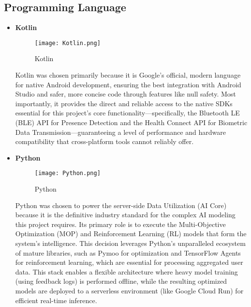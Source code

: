 \documentclass[conference]{IEEEtran}
\begin{document}
\subsection{Programming Language}
\begin{itemize}
    \item \textbf{Kotlin}\par
        \begin{figure}[h]
        \centering
        \texttt{[image: Kotlin.png]}
        \centering
        \caption{Kotlin} 
        \end{figure}\par
    Kotlin was chosen primarily because it is Google's official, modern language for native Android development, ensuring the best integration with Android Studio and safer, more concise code through features like null safety. Most importantly, it provides the direct and reliable access to the native SDKs essential for this project's core functionality—specifically, the Bluetooth LE (BLE) API for Presence Detection and the Health Connect API for Biometric Data Transmission—guaranteeing a level of performance and hardware compatibility that cross-platform tools cannot reliably offer.\\[1em]
    \item \textbf{Python}\par
        \begin{figure}[h]
        \centering
        \texttt{[image: Python.png]}
        \centering
        \caption{Python}
        \end{figure}\par
    Python was chosen to power the server-side Data Utilization (AI Core) because it is the definitive industry standard for the complex AI modeling this project requires. Its primary role is to execute the Multi-Objective Optimization (MOP) and Reinforcement Learning (RL) models that form the system's intelligence. This decision leverages Python's unparalleled ecosystem of mature libraries, such as Pymoo for optimization and TensorFlow Agents for reinforcement learning, which are essential for processing aggregated user data. This stack enables a flexible architecture where heavy model training (using feedback logs) is performed offline, while the resulting optimized models are deployed to a serverless environment (like Google Cloud Run) for efficient real-time inference.
\end{itemize}
\end{document}
